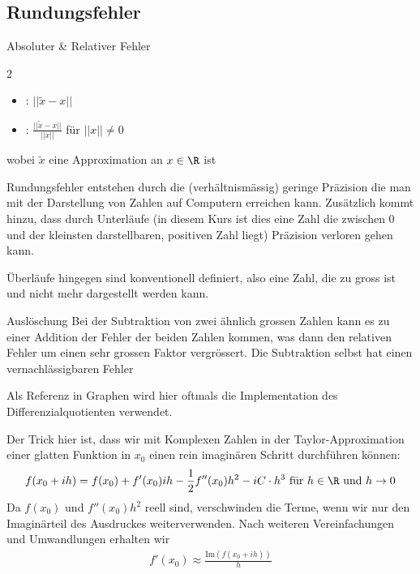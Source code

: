 
\subsection{Rundungsfehler}

\begin{definition}[]{Absoluter \& Relativer Fehler}
    \begin{multicols}{2}
        \begin{itemize}
            \item {}: $||\tilde{x} - x||$
            \item {}: $\displaystyle \frac{||\tilde{x} - x||}{||x||}$ für $||x|| \neq 0$
        \end{itemize}
    \end{multicols}
    wobei $\tilde{x}$ eine Approximation an $x \in \R$ ist
\end{definition}

Rundungsfehler entstehen durch die (verhältnismässig) geringe Präzision die man mit der Darstellung von Zahlen auf Computern erreichen kann.
Zusätzlich kommt hinzu, dass durch Unterläufe (in diesem Kurs ist dies eine Zahl die zwischen $0$ und der kleinsten darstellbaren, positiven Zahl liegt) Präzision verloren gehen kann.

Überläufe hingegen sind konventionell definiert, also eine Zahl, die zu gross ist und nicht mehr dargestellt werden kann.


\begin{remark}[]{Auslöschung}
    Bei der Subtraktion von zwei ähnlich grossen Zahlen kann es zu einer Addition der Fehler der beiden Zahlen kommen, was dann den relativen Fehler um einen sehr grossen Faktor vergrössert.
    Die Subtraktion selbst hat einen vernachlässigbaren Fehler
\end{remark}

 Als Referenz in Graphen wird hier oftmals die Implementation des Differenzialquotienten verwendet.

Der Trick hier ist, dass wir mit Komplexen Zahlen in der Taylor-Approximation einer glatten Funktion in $x_0$ einen rein imaginären Schritt durchführen können:
\begin{align*}
    f(x_0 + ih) = f(x_0) + f'(x_0)ih - \frac{1}{2} f''(x_0)h^2 - iC \cdot h^3 \text{ für } h \in \R \text{ und } h \rightarrow 0
\end{align*}
Da $f(x_0)$ und $f''(x_0)h^2$ reell sind, verschwinden die Terme, wenn wir nur den Imaginärteil des Ausdruckes weiterverwenden. Nach weiteren Vereinfachungen und Umwandlungen erhalten wir
\begin{align*}
    f'(x_0) \approx \frac{\text{Im}(f(x_0 + ih))}{h}
\end{align*}

